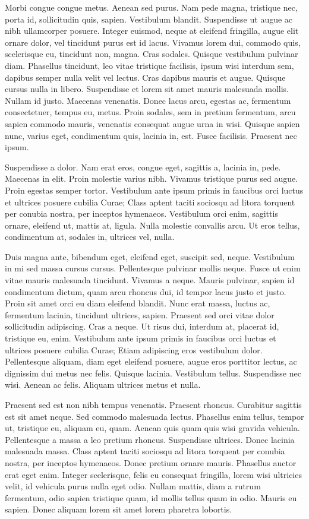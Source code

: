 \documentclass{article}
\begin{document}
Morbi congue congue metus. Aenean sed purus. Nam pede magna, tristique nec,
porta id, sollicitudin quis, sapien. Vestibulum blandit. Suspendisse ut augue
ac nibh ullamcorper posuere. Integer euismod, neque at eleifend fringilla,
augue elit ornare dolor, vel tincidunt purus est id lacus. Vivamus lorem dui,
commodo quis, scelerisque eu, tincidunt non, magna. Cras sodales. Quisque
vestibulum pulvinar diam. Phasellus tincidunt, leo vitae tristique facilisis,
ipsum wisi interdum sem, dapibus semper nulla velit vel lectus. Cras dapibus
mauris et augue. Quisque cursus nulla in libero. Suspendisse et lorem sit amet
mauris malesuada mollis. Nullam id justo. Maecenas venenatis. Donec lacus arcu,
egestas ac, fermentum consectetuer, tempus eu, metus. Proin sodales, sem in
pretium fermentum, arcu sapien commodo mauris, venenatis consequat augue urna
in wisi. Quisque sapien nunc, varius eget, condimentum quis, lacinia in, est.
Fusce facilisis. Praesent nec ipsum.

Suspendisse a dolor. Nam erat eros, congue eget, sagittis a, lacinia in,
pede. Maecenas in elit. Proin molestie varius nibh. Vivamus tristique purus sed
augue. Proin egestas semper tortor. Vestibulum ante ipsum primis in faucibus
orci luctus et ultrices posuere cubilia Curae; Class aptent taciti sociosqu ad
litora torquent per conubia nostra, per inceptos hymenaeos. Vestibulum orci
enim, sagittis ornare, eleifend ut, mattis at, ligula. Nulla molestie convallis
arcu. Ut eros tellus, condimentum at, sodales in, ultrices vel, nulla.

Duis magna ante, bibendum eget, eleifend eget, suscipit sed, neque. Vestibulum
in mi sed massa cursus cursus. Pellentesque pulvinar mollis neque. Fusce ut
enim vitae mauris malesuada tincidunt. Vivamus a neque. Mauris pulvinar, sapien
id condimentum dictum, quam arcu rhoncus dui, id tempor lacus justo et justo.
Proin sit amet orci eu diam eleifend blandit. Nunc erat massa, luctus ac,
fermentum lacinia, tincidunt ultrices, sapien. Praesent sed orci vitae dolor
sollicitudin adipiscing. Cras a neque. Ut risus dui, interdum at, placerat id,
tristique eu, enim. Vestibulum ante ipsum primis in faucibus orci luctus et
ultrices posuere cubilia Curae; Etiam adipiscing eros vestibulum dolor.
Pellentesque aliquam, diam eget eleifend posuere, augue eros porttitor lectus,
ac dignissim dui metus nec felis. Quisque lacinia. Vestibulum tellus.
Suspendisse nec wisi. Aenean ac felis. Aliquam ultrices metus et nulla.

Praesent sed est non nibh tempus venenatis. Praesent rhoncus. Curabitur
sagittis est sit amet neque. Sed commodo malesuada lectus. Phasellus enim
tellus, tempor ut, tristique eu, aliquam eu, quam. Aenean quis quam quis wisi
gravida vehicula. Pellentesque a massa a leo pretium rhoncus. Suspendisse
ultrices. Donec lacinia malesuada massa. Class aptent taciti sociosqu ad litora
torquent per conubia nostra, per inceptos hymenaeos. Donec pretium ornare
mauris. Phasellus auctor erat eget enim. Integer scelerisque, felis eu
consequat fringilla, lorem wisi ultricies velit, id vehicula purus nulla eget
odio. Nullam mattis, diam a rutrum fermentum, odio sapien tristique quam, id
mollis tellus quam in odio. Mauris eu sapien. Donec aliquam lorem sit amet
lorem pharetra lobortis.
\end{document}
